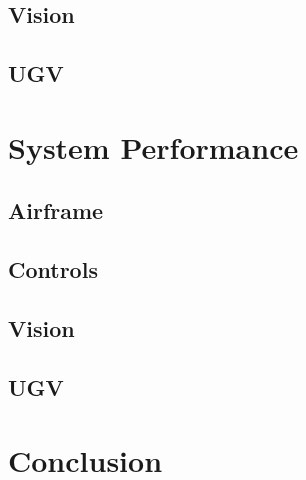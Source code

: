 \documentclass[]{auvsi_doc}
\begin{document}
\subsection{Vision}
\subsection{UGV}

\section{System Performance}

\subsection{Airframe}
\subsection{Controls}
\subsection{Vision}
\subsection{UGV}

\section{Conclusion}
\end{document}
